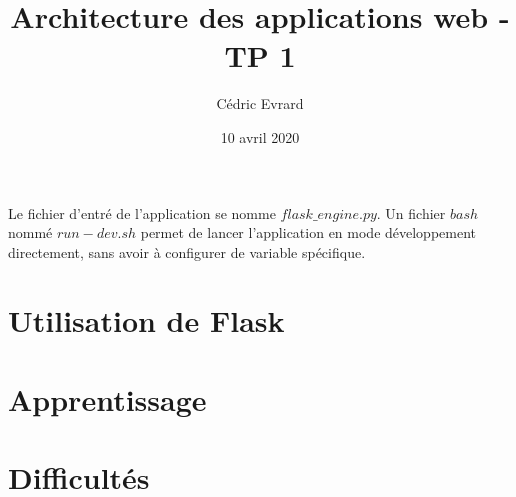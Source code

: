 \documentclass{article}
\title{Architecture des applications web - TP 1}
\author{Cédric Evrard}
\date{10 avril 2020}
\begin{document}
\maketitle

Le fichier d'entré de l'application se nomme $flask\_engine.py$. Un fichier $bash$ nommé $run-dev.sh$ permet de lancer l'application en mode développement directement, sans avoir à configurer de variable spécifique. 

\section{Utilisation de Flask}
\section{Apprentissage}
\section{Difficultés}
\end{document}
